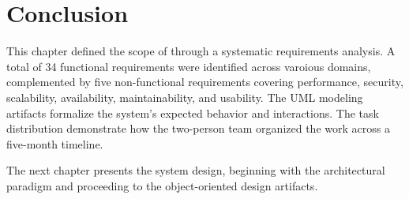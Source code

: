 \section*{Conclusion}

This chapter defined the scope of \eduspace{} through a systematic requirements analysis.
A total of 34 functional requirements were identified across varoious domains, complemented by five non-functional requirements covering performance, security, scalability, availability, maintainability, and usability.
The UML modeling artifacts formalize the system's expected behavior and interactions.
The task distribution demonstrate how the two-person team organized the work across a five-month timeline.

The next chapter presents the system design, beginning with the architectural paradigm and proceeding to the object-oriented design artifacts.
